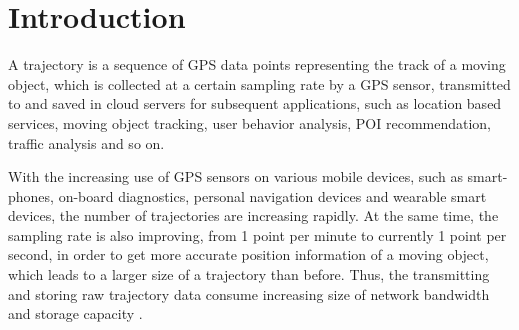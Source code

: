 \section{Introduction}
\label{sec-into}

A trajectory is a sequence of GPS data points representing the track of a moving object, which is collected at a certain sampling rate by a GPS sensor, transmitted to and saved in cloud servers for subsequent applications, such as location based services, moving object tracking, user behavior analysis, POI recommendation, {traffic analysis} and so on. 


With the increasing use of GPS sensors on various mobile devices, such as smart-phones, on-board diagnostics, personal navigation devices and wearable smart devices, the number of trajectories are increasing rapidly.
At the same time, the sampling rate is also improving, \eg from 1 point per minute to currently 1 point per second, in order to get more accurate position information of a moving object, which leads to a larger size of a trajectory than before. Thus, the transmitting and storing raw trajectory data consume increasing size of network bandwidth and storage capacity \cite{Chen:Trajectory,  Chen:Fast, Meratnia:Spatiotemporal, Keogh:online, Liu:BQS, Muckell:Compression,Cao:Spatio, Popa:Spatio, Schmid:Semantic,Richter:Semantic,Long:Direction,Nibali:Trajic}.

